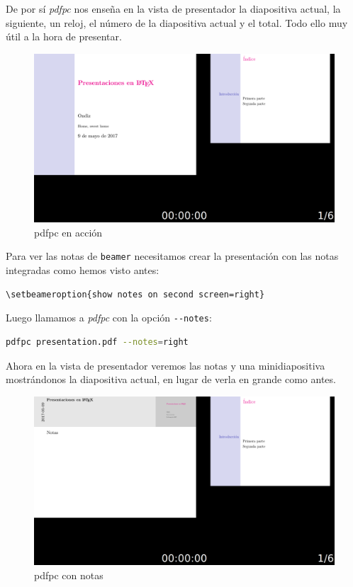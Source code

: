 De por sí \emph{pdfpc} nos enseña en la vista de presentador la
diapositiva actual, la siguiente, un reloj, el número de la diapositiva
actual y el total. Todo ello muy útil a la hora de presentar.

\begin{figure}[htbp]
\centering
\includegraphics[width=\textwidth]{docs/Figuras/pdfpc.png}
\caption{pdfpc en acción}
\end{figure}

Para ver las notas de \lstinline!beamer! necesitamos crear la
presentación con las notas integradas como hemos visto antes:

\begin{lstlisting}
\setbeameroption{show notes on second screen=right}
\end{lstlisting}

Luego llamamos a \emph{pdfpc} con la opción \lstinline!--notes!:

\begin{lstlisting}[language=bash]
pdfpc presentation.pdf --notes=right
\end{lstlisting}

Ahora en la vista de presentador veremos las notas y una minidiapositiva
mostrándonos la diapositiva actual, en lugar de verla en grande como
antes.

\begin{figure}[htbp]
\centering
\includegraphics[width=\textwidth]{docs/Figuras/pdfpcNotas.png}
\caption{pdfpc con notas}
\end{figure}

